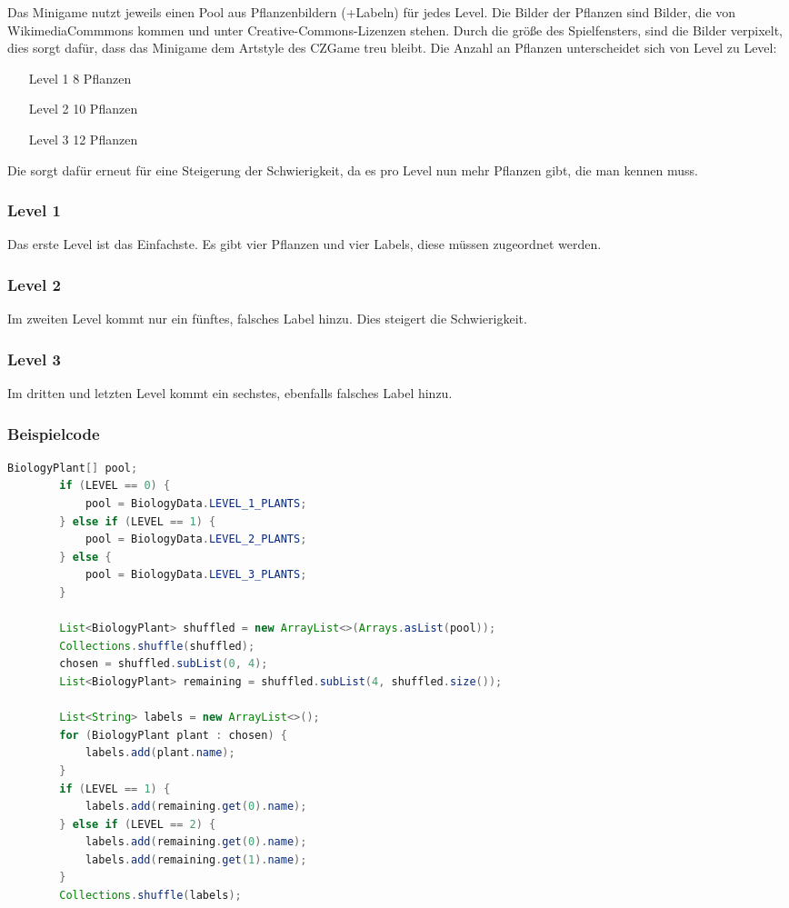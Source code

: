 Das Minigame nutzt jeweils einen Pool aus Pflanzenbildern (+Labeln) für jedes Level. Die Bilder der Pflanzen sind Bilder, die von WikimediaCommmons kommen und unter Creative-Commons-Lizenzen stehen. Durch die größe des Spielfensters, sind die Bilder verpixelt, dies sorgt dafür, dass das Minigame dem Artstyle des CZGame treu bleibt.
Die Anzahl an Pflanzen unterscheidet sich von Level zu Level:
\begin{itemize}
\item[Level 1] 8 Pflanzen
\item[Level 2] 10 Pflanzen
\item[Level 3] 12 Pflanzen
\end{itemize}
Die sorgt dafür erneut für eine Steigerung der Schwierigkeit, da es pro Level nun mehr Pflanzen gibt, die man kennen muss.

\subsubsection{Level 1}
Das erste Level ist das Einfachste. Es gibt vier Pflanzen und vier Labels, diese müssen zugeordnet werden.
\subsubsection{Level 2}
Im zweiten Level kommt nur ein fünftes, falsches Label hinzu. Dies steigert die Schwierigkeit.
\subsubsection{Level 3}
Im dritten und letzten Level kommt ein sechstes, ebenfalls falsches Label hinzu.

\subsubsection{Beispielcode}

\begin{lstlisting}[language=Java, caption={Zuordnung der Pflanzenlisten zu jedem Level, so wie das Mischen der Pflanzen und Labels}]
BiologyPlant[] pool;
        if (LEVEL == 0) {
            pool = BiologyData.LEVEL_1_PLANTS;
        } else if (LEVEL == 1) {
            pool = BiologyData.LEVEL_2_PLANTS;
        } else {
            pool = BiologyData.LEVEL_3_PLANTS;
        }

        List<BiologyPlant> shuffled = new ArrayList<>(Arrays.asList(pool));
        Collections.shuffle(shuffled);
        chosen = shuffled.subList(0, 4);
        List<BiologyPlant> remaining = shuffled.subList(4, shuffled.size());

        List<String> labels = new ArrayList<>();
        for (BiologyPlant plant : chosen) {
            labels.add(plant.name);
        }
        if (LEVEL == 1) {
            labels.add(remaining.get(0).name);
        } else if (LEVEL == 2) {
            labels.add(remaining.get(0).name);
            labels.add(remaining.get(1).name);
        }
        Collections.shuffle(labels);
\end{lstlisting}

